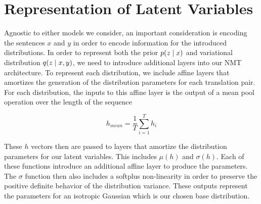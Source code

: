 




\section{Representation of Latent Variables}

Agnostic to either models we consider, an important consideration is encoding the sentences $x$ and $y$ in order to encode information for the introduced distributions. In order to represent both the prior $p(z \; | \;{x})$ and variational distribution $q(z \; | \;{x, y})$, we need to introduce additional layers into our \ac{NMT} architecture. To represent each distribution, we include affine layers that amortizes the generation of the distribution parameters for each translation pair. For each distribution, the inputs to this affine layer is the output of a mean pool operation over the length of the sequence

\begin{equation}
h_{mean} = \frac{1}{T} \sum_{i=1}^{T} h_{i}
\end{equation}

These $h$ vectors then are passed to layers that amortize the distribution parameters for our latent variables. This includes $\mu(h)$ and $\sigma(h)$. Each of these functions introduce an additional affine layer to produce the parameters. The $\sigma$ function then also includes a softplus non-linearity in order to preserve the positive definite behavior of the distribution variance. These outputs represent the parameters for an isotropic Gaussian which is our chosen base distribution. 





